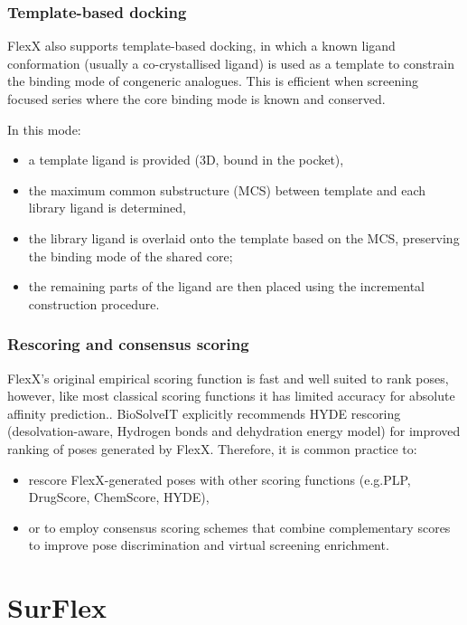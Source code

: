 \documentclass[12pt, a4paper]{article}
\begin{document}
\subsubsection{Template-based docking}
FlexX also supports template-based docking, in which a known ligand conformation (usually a co-crystallised ligand) is used as a template to constrain the binding mode of congeneric analogues. This is efficient when screening focused series where the core binding mode is known and conserved.

In this mode:
\begin{itemize}
  \item a template ligand is provided (3D, bound in the pocket),
  \item the maximum common substructure (MCS) between template and each library ligand is determined,
  \item the library ligand is overlaid onto the template based on the MCS, preserving the binding mode of the shared core;
  \item the remaining parts of the ligand are then placed using the incremental construction procedure.
\end{itemize}


\subsubsection{Rescoring and consensus scoring}

FlexX's original empirical scoring function is fast and well suited to rank poses, however,  like most classical scoring functions it has limited accuracy for absolute affinity prediction.\cite{CH7_stahl}. BioSolveIT explicitly recommends HYDE rescoring (desolvation-aware, Hydrogen bonds and dehydration energy model) for improved ranking of poses generated by FlexX.
Therefore, it is common practice to:
\begin{itemize}
  \item rescore FlexX-generated poses with other scoring functions (e.g.PLP, DrugScore, ChemScore, HYDE),
  \item or to employ consensus scoring schemes that combine complementary scores to improve pose discrimination and virtual screening enrichment.
\end{itemize}


\section{SurFlex}
\end{document}
